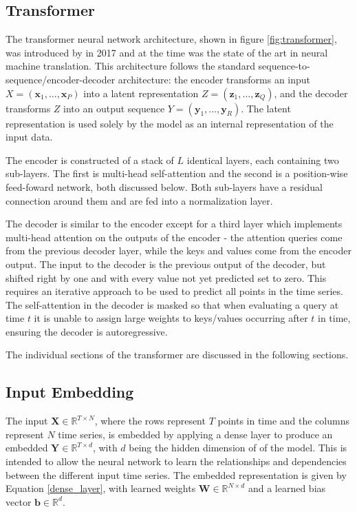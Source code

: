 \documentclass[conference]{IEEEtran}
\begin{document}
\subsection{Transformer}
The transformer neural network architecture, shown in figure \ref{fig:transformer}, was introduced by \cite{Vaswani2017} in 2017 and at the time was the state of the art in neural machine translation.
This architecture follows the standard sequence-to-sequence/encoder-decoder architecture: the encoder transforms an input $X = (\boldsymbol{x}_1, ..., \boldsymbol{x}_P)$ into a latent representation $Z = (\boldsymbol{z}_1, ..., \boldsymbol{z}_Q)$, and the decoder transforms $Z$ into an output sequence $Y = (\boldsymbol{y}_1, ..., \boldsymbol{y}_R)$.
The latent representation is used solely by the model as an internal representation of the input data.

The encoder is constructed of a stack of $L$ identical layers, each containing two sub-layers.
The first is multi-head self-attention and the second is a position-wise feed-foward network, both discussed below.
Both sub-layers have a residual connection around them and are fed into a normalization layer.

The decoder is similar to the encoder except for a third layer which implements multi-head attention on the outputs of the encoder - the attention queries come from the previous decoder layer, while the keys and values come from the encoder output.
The input to the decoder is the previous output of the decoder, but shifted right by one and with every value not yet predicted set to zero.
This requires an iterative approach to be used to predict all points in the time series.
The self-attention in the decoder is masked so that when evaluating a query at time $t$ it is unable to assign large weights to keys/values occurring after $t$ in time, ensuring the decoder is autoregressive.

The individual sections of the transformer are discussed in the following sections.

\subsection{Input Embedding}
The input $\boldsymbol{X} \in \mathbb{R}^{T \times N}$, where the rows represent $T$ points in time and the columns represent $N$ time series, is embedded by applying a dense layer to produce an embedded $\boldsymbol{Y} \in \mathbb{R}^{T \times d}$, with $d$ being the hidden dimension of of the model.
This is intended to allow the neural network to learn the relationships and dependencies between the different input time series.
The embedded representation is given by Equation \ref{dense_layer}, with learned weights $\boldsymbol{W} \in \mathbb{R}^{N \times d}$ and a learned bias vector $\boldsymbol{b} \in \mathbb{R}^{d}$.
\end{document}
